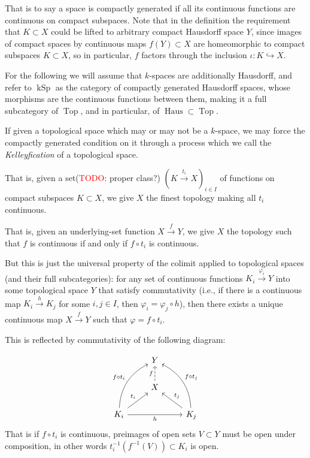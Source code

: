 \documentclass[12pt,a4paper]{article}
\DeclareMathOperator{\Top}{Top}
\DeclareMathOperator{\kSp}{kSp}
\DeclareMathOperator{\Haus}{Haus}
\begin{document}
That is to say a space is compactly generated if all its continuous functions are continuous on compact subspaces. Note that in the definition the requirement that $K \subset X$ could be lifted to arbitrary compact Hausdorff space $Y$, since images of compact spaces by continuous maps $f(Y) \subset X$ are homeomorphic to compact subspaces  $K \subset X$, so in particular, $f$ factors through the inclusion $\iota: K \hookrightarrow X$. 

For the following we will assume that $k$-spaces are additionally Hausdorff, and refer to ${\kSp}$ as the category of compactly generated Hausdorff spaces, whose morphisms are the continuous functions between them, making it a full subcategory of $\Top$, and in particular, of $\Haus \subset \Top$. 

If given a topological space which may or may not be a $k$-space, we may force the compactly generated condition on it through a process which we call the \emph{Kelleyfication} of a topological space.

That is, given a set(\textcolor{red}{TODO}: proper class?) $(K \stackrel{t_i}{\to} X)_{i \in I}$ of functions on compact subspaces $K\subset X$, we give $X$ the finest topology making all $t_i$ continuous. 

That is, given an underlying-set function $X \stackrel{f}{\to} Y$, we give $X$ the topology such that $f$ is continuous if and only if $f \circ t_i$ is continuous. 

But this is just the universal property of the colimit applied to topological spaces (and their full subcategories): for any set of continuous functions  $K_i \stackrel{\varphi_i}{\to}Y$ into some topological space $Y$ that satisfy commutativity (i.e., if there is a continuous map $K_i \stackrel{h}{\to} K_j $ for some $i, j \in I$, then $\varphi_i = \varphi_j \circ h$), then there exists a unique continuous map $X \stackrel{f}{\to}Y$ such that $\varphi = f \circ t_i$. 

This is reflected by commutativity of the following diagram:

\[\begin{tikzcd}
	& Y \\
	& X \\
	{K_i} && {K_j}
	\arrow["f", dashed, from=2-2, to=1-2]
	\arrow["{f \circ t_i}", bend left,  from=3-1, to=1-2]
	\arrow["{t_i}", from=3-1, to=2-2]
	\arrow["h"', from=3-1, to=3-3]
	\arrow["{f \circ t_j}"', bend right, from=3-3,  to=1-2]
	\arrow["{t_j}"', from=3-3, to=2-2]
\end{tikzcd}\]
That is if $f \circ t_i$ is continuous, preimages of open sets $V \subset Y$ must be open under composition, in other words $t_i^{-1}(f^{-1}(V)) \subset K_i$ is open. 
\end{document}

